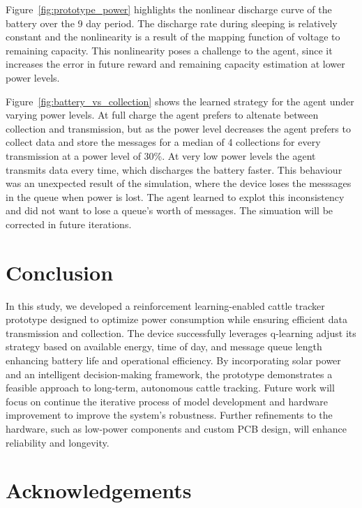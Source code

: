 \documentclass[10pt]{cai}
\begin{document}
Figure~\ref{fig:prototype_power} highlights the nonlinear discharge curve of the battery over the 9 day period. 
The discharge rate during sleeping is relatively constant and the nonlinearity is a result of the mapping function of voltage to remaining capacity.
This nonlinearity poses a challenge to the agent, since it increases the error in future reward and remaining capacity estimation at lower power levels.

Figure~\ref{fig:battery_vs_collection} shows the learned strategy for the agent under varying power levels.
At full charge the agent prefers to altenate between collection and transmission, but as the power level decreases the agent prefers to collect data and store the messages for a median of 4 collections for every transmission at a power level of 30\%.
At very low power levels the agent transmits data every time, which discharges the battery faster.
This behaviour was an unexpected result of the simulation, where the device loses the messsages in the queue when power is lost.
The agent learned to explot this inconsistency and did not want to lose a queue's worth of messages.
The simuation will be corrected in future iterations.


\section{Conclusion}
In this study, we developed a reinforcement learning-enabled cattle tracker prototype designed to optimize power consumption while ensuring efficient data transmission and collection.
The device successfully leverages q-learning adjust its strategy based on available energy, time of day, and message queue length enhancing battery life and operational efficiency.
By incorporating solar power and an intelligent decision-making framework, the prototype demonstrates a feasible approach to long-term, autonomous cattle tracking.
Future work will focus on continue the iterative process of model development and hardware improvement to improve the system's robustness.
Further refinements to the hardware, such as low-power components and custom PCB design, will enhance reliability and longevity. 

\section*{Acknowledgements}

\printbibliography[heading=subbibintoc]
\end{document}
